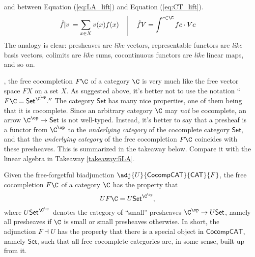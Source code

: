 and between Equation (\ref{eq:LA_lift}) and Equation (\ref{eq:CT_lift}).
\[
\begin{array}{c@{\hspace{3ex}}|@{\hspace{3ex}}c}
\hat f|v\>=\displaystyle\sum_{x\in X}v(x)f(x)
&
\hat{f}V= \displaystyle\int^{c\in\C} fc \cdot Vc
\end{array} 
\]
The analogy is clear: presheaves are \textit{like} vectors, representable functors are \textit{like} basis vectors, colimits are \textit{like} sums, cocontinuous functors are \textit{like} linear maps, and so on. 


, the free cocompletion $F\C$ of a category $\C$ is very much like the free vector space $FX$ on a set $X$. As suggested above, it's better not to use the notation ``$F\C=\mathsf{Set}^{\C^{\op}}.''$ The category $\mathsf{Set}$ has many nice properties, one of them being that it is cocomplete. Since an arbitrary category $\C$ may \textit{not} be cocomplete, an arrow $\C^{\op}\to \mathsf{Set}$ is not well-typed. Instead, it's better to say that a presheaf is a functor from $\C^{\op}$ to the \textit{underlying category} of the cocomplete category $\mathsf{Set}$, and that the \textit{underlying category} of the free cocompletion $F\C$ coincides with these presheaves. This is summarized in the takeaway below. Compare it with the linear algebra in Takeaway \ref{takeaway:5LA}.

\begin{takeaway}\label{takeaway:5CT}
Given the free-forgetful biadjunction $\adj{U}{\mathsf{CocompCAT}}{\mathsf{CAT}}{F}$, the free cocompletion $F\C$ of a category $\C$ has the property that
\begin{equation}
UF\C=U\mathsf{Set}^{\C^{\op}},
\end{equation}
where $U\mathsf{Set}^{\C^{\op}}$ denotes the category of ``small'' presheaves $\C^{\op}\to U\mathsf{Set}$, namely all presheaves if $\C$ is small or small presheaves otherwise. In short, the adjunction $F\dashv U$ has the property that there is a special object in $\mathsf{CocompCAT}$, namely $\mathsf{Set}$, such that all free cocomplete categories are, in some sense, built up from it.
\end{takeaway}

